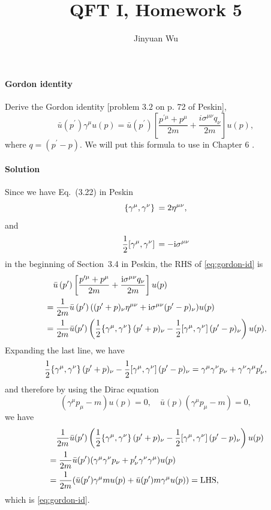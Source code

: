\documentclass[hyperref, a4paper]{article}
\title{QFT I, Homework 5}
\author{Jinyuan Wu}
\newcommand*{\ii}{\mathrm{i}}
\begin{document}
\maketitle

\paragraph{Gordon identity} Derive the Gordon identity [problem $3.2$ on p. 72 of Peskin],
\begin{equation}
    \bar{u}\left(p^{\prime}\right) \gamma^{\mu} u(p)=\bar{u}\left(p^{\prime}\right)\left[\frac{p^{\prime \mu}+p^{\mu}}{2 m}+\frac{i \sigma^{\mu \nu} q_{\nu}}{2 m}\right] u(p),
    \label{eq:gordon-id}
\end{equation}
where $q=\left(p^{\prime}-p\right)$. We will put this formula to use in Chapter 6 .

\paragraph{Solution} Since we have Eq.~(3.22) in Peskin
\begin{equation}
    \acomm*{\gamma^\mu}{\gamma^\nu} = 2 \eta^{\mu \nu}, 
\end{equation}
and 
\begin{equation}
    \frac{1}{2} \comm*{\gamma^\mu}{\gamma^\nu} = - \ii \sigma^{\mu \nu}
\end{equation}
in the beginning of Section~3.4 in Peskin, the RHS of \eqref{eq:gordon-id} is 
\[
    \begin{aligned}
        &\quad \bar{u}\left(p^{\prime}\right)\left[\frac{p^{\prime \mu}+p^{\mu}}{2 m}+\frac{\ii \sigma^{\mu \nu} q_{\nu}}{2 m}\right] u(p) \\
        &= \frac{1}{2m} \bar{u}\left(p^{\prime}\right) ( (p' + p)_\nu \eta^{\mu \nu} + \ii \sigma^{\mu \nu} (p' - p)_\nu ) u(p) \\
        &= \frac{1}{2m} \bar{u}(p') \left( \frac{1}{2} \acomm*{\gamma^\mu}{\gamma^\nu} (p' + p)_\nu - \frac{1}{2} \comm*{\gamma^\mu}{\gamma^\nu} (p' - p)_\nu \right) u(p).
    \end{aligned}
\]
Expanding the last line, we have 
\[
    \frac{1}{2} \acomm*{\gamma^\mu}{\gamma^\nu} (p' + p)_\nu - \frac{1}{2} \comm*{\gamma^\mu}{\gamma^\nu} (p' - p)_\nu = \gamma^\mu \gamma^\nu p_\nu + \gamma^\nu \gamma^\mu p'_\nu,
\]
and therefore by using the Dirac equation 
\[
    (\gamma^\mu p_\mu - m) u(p) = 0, \quad \bar{u}(p) (\gamma^\mu p_\mu - m) = 0,
\]
we have
\[
    \begin{aligned}
        &\quad \frac{1}{2m} \bar{u}(p') \left( \frac{1}{2} \acomm*{\gamma^\mu}{\gamma^\nu} (p' + p)_\nu - \frac{1}{2} \comm*{\gamma^\mu}{\gamma^\nu} (p' - p)_\nu \right) u(p) \\
        &= \frac{1}{2m} \bar{u}(p') (\gamma^\mu \gamma^\nu p_\nu + p'_\nu \gamma^\nu \gamma^\mu ) u(p) \\
        &= \frac{1}{2m} (\bar{u}(p') \gamma^\mu m u(p) + \bar{u}(p') m \gamma^\mu u(p) ) = \text{LHS},
    \end{aligned}
\]
which is \eqref{eq:gordon-id}.
\end{document}
